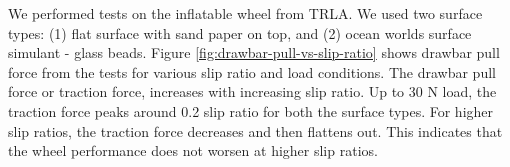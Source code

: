 \documentclass{article}
\begin{document}
We performed tests on the inflatable wheel from TRLA. We used two surface types: (1) flat surface with sand paper on top, and (2) ocean worlds surface simulant - glass beads. Figure \ref{fig:drawbar-pull-vs-slip-ratio} shows drawbar pull force from the tests for various slip ratio and load conditions. The drawbar pull force or traction force, increases with increasing slip ratio. Up to 30 N load, the traction force peaks around 0.2 slip ratio for both the surface types. For higher slip ratios, the traction force decreases and then flattens out. This indicates that the wheel performance does not worsen at higher slip ratios. 

\begin{figure}[hbt!]
    \centering
    \begin{minipage}{0.45\textwidth}
        \centering
    \end{minipage}
    \begin{minipage}{0.45\textwidth}
        \centering

\end{minipage}
\end{figure}
\end{document}
